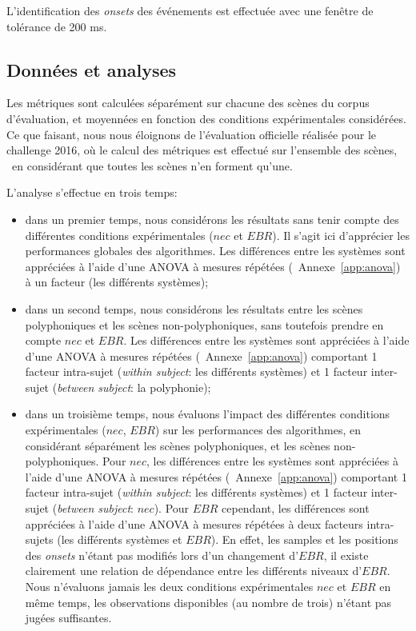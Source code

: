 L'identification des \emph{onsets} des événements est effectuée avec une fenêtre de tolérance de 200 ms.

\subsection{Données et analyses}

Les métriques sont calculées séparément sur chacune des scènes du corpus d'évaluation, et moyennées en fonction des conditions expérimentales considérées. Ce que faisant, nous nous éloignons de l'évaluation officielle réalisée pour le challenge 2016, où le calcul des métriques est effectué sur l'ensemble des scènes, \ie~en considérant que toutes les scènes n'en forment qu'une.

L'analyse s'effectue en trois temps:

\begin{itemize}
\item dans un premier temps, nous considérons les résultats sans tenir compte des différentes conditions expérimentales ($nec$ et $EBR$). Il s'agit ici d'apprécier les performances globales des algorithmes. Les différences entre les systèmes sont appréciées à l'aide d'une ANOVA à mesures répétées (\cf~Annexe~\ref{app:anova}) à un facteur (les différents systèmes);
\item dans un second temps, nous considérons les résultats entre les scènes polyphoniques et les scènes non-polyphoniques, sans toutefois prendre en compte $nec$ et $EBR$. Les différences entre les systèmes sont appréciées à l'aide d'une ANOVA à mesures répétées (\cf~Annexe~\ref{app:anova}) comportant 1 facteur intra-sujet (\emph{within subject}: les différents systèmes) et 1 facteur inter-sujet (\emph{between subject}: la polyphonie); 
\item dans un troisième temps, nous évaluons l'impact des différentes conditions expérimentales ($nec$, $EBR$) sur les performances des algorithmes, en considérant séparément les scènes polyphoniques, et les scènes non-polyphoniques. Pour $nec$, les différences entre les systèmes sont appréciées à l'aide d'une ANOVA à mesures répétées (\cf~Annexe~\ref{app:anova}) comportant 1 facteur intra-sujet (\emph{within subject}: les différents systèmes) et 1 facteur inter-sujet (\emph{between subject}: $nec$). Pour $EBR$ cependant, les différences sont appréciées à l'aide d'une ANOVA à mesures répétées à deux facteurs intra-sujets (les différents systèmes et $EBR$). En effet, les samples et les positions des \emph{onsets} n'étant pas modifiés lors d'un changement d'$EBR$, il existe clairement une relation de dépendance entre les différents niveaux d'$EBR$. Nous n'évaluons jamais les deux conditions expérimentales $nec$ et $EBR$ en même temps, les observations disponibles (au nombre de trois) n'étant pas jugées suffisantes.
\end{itemize}

